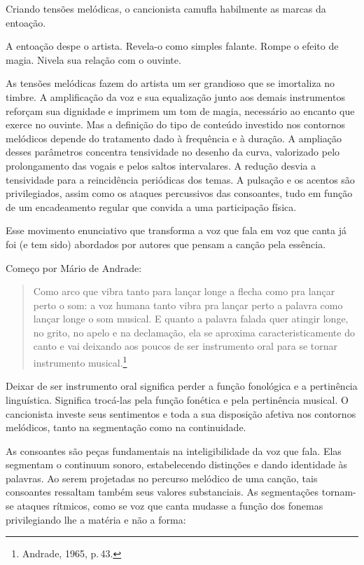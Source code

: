 Criando tensões melódicas, o cancionista camufla habilmente as marcas da
entoação.

A entoação despe o artista. Revela-o como simples falante. Rompe o
efeito de magia. Nivela sua relação com o ouvinte.

As tensões melódicas fazem do artista um ser grandioso que se imortaliza
no timbre. A amplificação da voz e sua equalização junto aos demais
instrumentos reforçam sua dignidade e imprimem um tom de magia,
necessário ao encanto que exerce no ouvinte. Mas a definição do tipo de
conteúdo investido nos contornos melódicos depende do tratamento dado à
frequência e à duração. A ampliação desses parâmetros concentra
tensividade no desenho da curva, valorizado pelo prolongamento das
vogais e pelos saltos intervalares. A redução desvia a tensividade para
a reincidência periódicas dos temas. A pulsação e os acentos são
privilegiados, assim como os ataques percussivos das consoantes, tudo em
função de um encadeamento regular que convida a uma participação física.

Esse movimento enunciativo que transforma a voz que fala em voz que
canta já foi (e tem sido) abordados por autores que pensam a canção pela
essência.

Começo por Mário de Andrade:

\begin{quote}
Como arco que vibra tanto para lançar longe a flecha como pra lançar
perto o som: a voz humana tanto vibra pra lançar perto a palavra como
lançar longe o som musical. E quanto a palavra falada quer atingir
longe, no grito, no apelo e na declamação, ela se aproxima
caracteristicamente do canto e vai deixando aos poucos de ser
instrumento oral para se tornar instrumento musical.\footnote{Andrade, 1965,
p.\,43.}
\end{quote}

Deixar de ser instrumento oral significa perder a função fonológica e a
pertinência linguística. Significa trocá-las pela função fonética e pela
pertinência musical. O cancionista investe seus sentimentos e toda a sua
disposição afetiva nos contornos melódicos, tanto na segmentação como na
continuidade.

As consoantes são peças fundamentais na inteligibilidade da voz que
fala. Elas segmentam o continuum sonoro, estabelecendo distinções e
dando identidade às palavras. Ao serem projetadas no percurso melódico
de uma canção, tais consoantes ressaltam também seus valores
substanciais. As segmentações tornam-se ataques rítmicos, como se voz
que canta mudasse a função dos fonemas privilegiando lhe a matéria e não
a forma:

